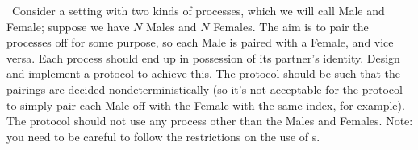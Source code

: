 \begin{question}
\Programming\ Consider a setting with two kinds of processes, which we will
call Male and Female; suppose we have $N$ Males and $N$ Females.  The aim is
to pair the processes off for some purpose, so each Male is paired with a
Female, and vice versa.  Each process should end up in possession of its
partner's identity.  Design and implement a protocol to achieve this.  The
protocol should be such that the pairings are decided nondeterministically (so
it's not acceptable for the protocol to simply pair each Male off with the
Female with the same index, for example).  The protocol should not use any
process other than the Males and Females.  Note: you need to be careful to
follow the restrictions on the use of s.
\end{question}


